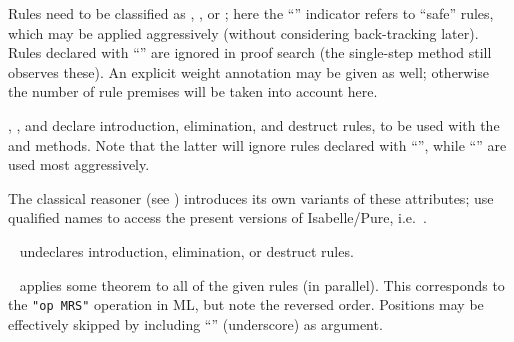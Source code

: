 \begin{isabellebody}
\begin{isamarkuptext}
\begin{descr}
  Rules need to be classified as \hyperlink{attribute.Pure.intro}{\mbox{}},
  \hyperlink{attribute.Pure.elim}{\mbox{}}, or \hyperlink{attribute.Pure.dest}{\mbox{}}; here the
  ``\isa{{\isachardoublequote}{\isacharbang}{\isachardoublequote}}'' indicator refers to ``safe'' rules, which may be
  applied aggressively (without considering back-tracking later).
  Rules declared with ``\isa{{\isachardoublequote}{\isacharquery}{\isachardoublequote}}'' are ignored in proof search (the
  single-step \hyperlink{method.rule}{\mbox{}} method still observes these).  An
  explicit weight annotation may be given as well; otherwise the
  number of rule premises will be taken into account here.
  
  \item [\hyperlink{attribute.Pure.intro}{\mbox{\isa{intro}}}, \hyperlink{attribute.Pure.elim}{\mbox{\isa{elim}}}, and
  \hyperlink{attribute.Pure.dest}{\mbox{\isa{dest}}}] declare introduction, elimination, and
  destruct rules, to be used with the \hyperlink{method.rule}{\mbox{}} and \hyperlink{method.iprover}{\mbox{}} methods.  Note that the latter will ignore rules declared
  with ``\isa{{\isachardoublequote}{\isacharquery}{\isachardoublequote}}'', while ``\isa{{\isachardoublequote}{\isacharbang}{\isachardoublequote}}''  are used most
  aggressively.
  
  The classical reasoner (see ) introduces its
  own variants of these attributes; use qualified names to access the
  present versions of Isabelle/Pure, i.e.\ \hyperlink{attribute.Pure.Pure.intro}{\mbox{}}.
  
  \item [\hyperlink{attribute.rule}{\mbox{\isa{rule}}}~\isa{del}] undeclares introduction,
  elimination, or destruct rules.
  
  \item [\hyperlink{attribute.OF}{\mbox{\isa{OF}}}~\isa{{\isachardoublequote}a\isactrlsub {\isadigit{1}}\ {\isasymdots}\ a\isactrlsub n{\isachardoublequote}}] applies some
  theorem to all of the given rules 
  (in parallel).  This corresponds to the \verb|"op MRS"| operation in
  ML, but note the reversed order.  Positions may be effectively
  skipped by including ``\isa{{\isacharunderscore}}'' (underscore) as argument.
  

\end{descr}
\end{isamarkuptext}
\end{isabellebody}
